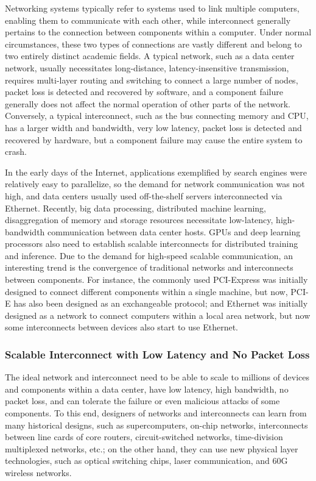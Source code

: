 Networking systems typically refer to systems used to link multiple computers, enabling them to communicate with each other, while interconnect generally pertains to the connection between components within a computer. Under normal circumstances, these two types of connections are vastly different and belong to two entirely distinct academic fields. A typical network, such as a data center network, usually necessitates long-distance, latency-insensitive transmission, requires multi-layer routing and switching to connect a large number of nodes, packet loss is detected and recovered by software, and a component failure generally does not affect the normal operation of other parts of the network. Conversely, a typical interconnect, such as the bus connecting memory and CPU, has a larger width and bandwidth, very low latency, packet loss is detected and recovered by hardware, but a component failure may cause the entire system to crash.

In the early days of the Internet, applications exemplified by search engines were relatively easy to parallelize, so the demand for network communication was not high, and data centers usually used off-the-shelf servers interconnected via Ethernet. Recently, big data processing, distributed machine learning, disaggregation of memory and storage resources necessitate low-latency, high-bandwidth communication between data center hosts. GPUs and deep learning processors also need to establish scalable interconnects for distributed training and inference. Due to the demand for high-speed scalable communication, an interesting trend is the convergence of traditional networks and interconnects between components. For instance, the commonly used PCI-Express was initially designed to connect different components within a single machine, but now, PCI-E has also been designed as an exchangeable protocol; and Ethernet was initially designed as a network to connect computers within a local area network, but now some interconnects between devices also start to use Ethernet.

\subsubsection{Scalable Interconnect with Low Latency and No Packet Loss}

The ideal network and interconnect need to be able to scale to millions of devices and components within a data center, have low latency, high bandwidth, no packet loss, and can tolerate the failure or even malicious attacks of some components. To this end, designers of networks and interconnects can learn from many historical designs, such as supercomputers, on-chip networks, interconnects between line cards of core routers, circuit-switched networks, time-division multiplexed networks, etc.; on the other hand, they can use new physical layer technologies, such as optical switching chips, laser communication, and 60G wireless networks.

